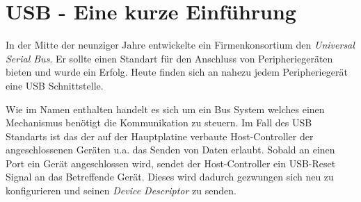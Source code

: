 \chapter{USB - Eine kurze Einführung}
In der Mitte der neunziger Jahre entwickelte ein Firmenkonsortium den \textit{Universal Serial Bus}.
Er sollte einen Standart für den Anschluss von Peripheriegeräten bieten und wurde ein Erfolg.
Heute finden sich an nahezu jedem Peripheriegerät eine USB Schnittstelle.

Wie im Namen enthalten handelt es sich um ein Bus System welches einen Mechanismus benötigt die Kommunikation zu steuern.
Im Fall des USB Standarts ist das der auf der Hauptplatine verbaute Host-Controller der angeschlossenen Geräten u.a. das Senden von Daten erlaubt.
Sobald an einen Port ein Gerät angeschlossen wird, sendet der Host-Controller ein USB-Reset Signal an das Betreffende Gerät.
Dieses wird dadurch gezwungen sich neu zu konfigurieren und seinen \textit{Device Descriptor} zu senden.
